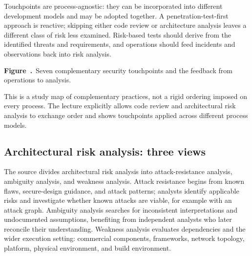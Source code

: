 \documentclass[11pt,a4paper]{article}
\numberwithin{figure}{section}
\newcommand{\diagramcaption}[1]{\par\smallskip\refstepcounter{figure}\begin{center}\small\textbf{Figure~\thefigure.}~#1\end{center}}
\begin{document}
Touchpoints are process-agnostic: they can be incorporated into different development models and may be adopted together. A penetration-test-first approach is reactive; skipping either code review or architecture analysis leaves a different class of risk less examined. Risk-based tests should derive from the identified threats and requirements, and operations should feed incidents and observations back into risk analysis.

\begin{center}\end{center}
\diagramcaption{Seven complementary security touchpoints and the feedback from operations to analysis.}
This is a study map of complementary practices, not a rigid ordering imposed on every process. The lecture explicitly allows code review and architectural risk analysis to exchange order and shows touchpoints applied across different process models.

\subsection{Architectural risk analysis: three views}
The source divides architectural risk analysis into attack-resistance analysis, ambiguity analysis, and weakness analysis. Attack resistance begins from known flaws, secure-design guidance, and attack patterns; analysts identify applicable risks and investigate whether known attacks are viable, for example with an attack graph. Ambiguity analysis searches for inconsistent interpretations and undocumented assumptions, benefiting from independent analysts who later reconcile their understanding. Weakness analysis evaluates dependencies and the wider execution setting: commercial components, frameworks, network topology, platform, physical environment, and build environment.
\end{document}
